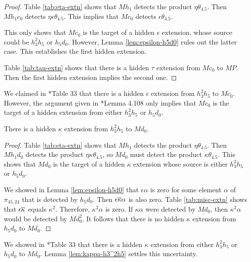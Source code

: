 \begin{proof}
Table \ref{tab:eta-extn} shows that
$M h_1$ detects the product $\eta \theta_{4.5}$.
Then $M h_1 c_0$ detects $\eta \epsilon \theta_{4.5}$.
This implies that $M c_0$ detects $\epsilon \theta_{4.5}$.

This only shows that $M c_0$ is the target of a hidden
$\epsilon$ extension, whose source could be $h_3^2 h_5$
or $h_5 d_0$.  However, Lemma \ref{lem:epsilon-h5d0}
rules out the latter case.
This establishes the first hidden extension.

Table \ref{tab:tau-extn} shows that there is a hidden
$\tau$ extension from $M c_0$ to $M P$.  Then the first
hidden extension implies the second one.
\end{proof}

\begin{remark}
We claimed in \cite{Isaksen14c}*{Table 33} that there is a
hidden $\epsilon$ extension from $h_3^2 h_5$ to $M c_0$.
However, the argument given in \cite{Isaksen14c}*{Lemma 4.108}
only implies that $M c_0$ is the target of a hidden extension
from either $h_3^2 h_5$ or $h_5 d_0$.
\end{remark}

\begin{lemma}
\label{lem:kappa-h3^2h5}
There is a hidden $\kappa$ extension from $h_3^2 h_5$ to $M d_0$.
\end{lemma}

\begin{proof}
Table \ref{tab:eta-extn} shows that
$M h_1$ detects the product $\eta \theta_{4.5}$.
Then $M h_1 d_0$ detects the product $\eta \kappa \theta_{4.5}$,
so $M d_0$ must detect the product $\kappa \theta_{4.5}$.
This shows that $M d_0$ is the target of a hidden $\kappa$ extension
whose source is either $h_3^2 h_5$ or $h_5 d_0$.

We showed in Lemma \ref{lem:epsilon-h5d0}
that $\epsilon \alpha$ is zero for some element 
$\alpha$ of $\pi_{45,24}$ that is detected by $h_5 d_0$.
Then $\epsilon \overline{\kappa} \alpha$ is also zero.
Table \ref{tab:misc-extn} shows that
$\epsilon \overline{\kappa}$ equals $\kappa^2$.
Therefore,
$\kappa^2 \alpha$ is zero.
If $\kappa \alpha$ were detected by $M d_0$, 
then $\kappa^2 \alpha$ would be detected by $M d_0^2$.
It follows that there is no hidden $\kappa$ extension
from $h_5 d_0$ to $M d_0$.
\end{proof}

\begin{remark}
We showed in \cite{Isaksen14c}*{Table 33} that there is a 
hidden $\kappa$ extension from either $h_3^2 h_5$ or $h_5 d_0$
to $M d_0$. Lemma \ref{lem:kappa-h3^2h5} settles this uncertainty.
\end{remark}

